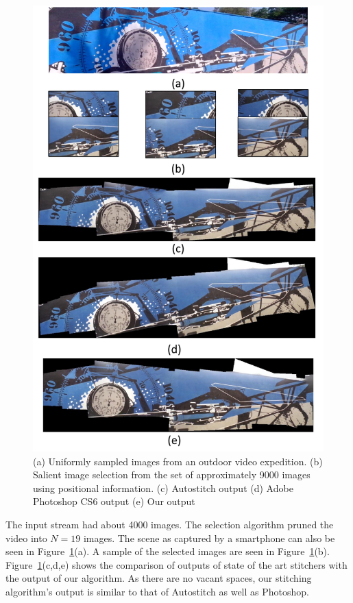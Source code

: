 \documentclass[10pt,twocolumn,letterpaper]{article}
\begin{document}
\begin{figure}[h!]
\centering
\includegraphics[width=0.8\linewidth]{figures/sac2.pdf}
\caption{ (a) Uniformly sampled images from an outdoor video
  expedition.  (b) Salient image selection from the set of
  approximately 9000 images using positional information. (c) Autostitch output
  (d) Adobe Photoshop CS6 output (e) Our output }
\label{fig:validResults1}
\end{figure}

The input stream had about 4000 images. The selection
algorithm pruned the video into $N=19$ images.
The scene as captured by a smartphone can also be seen in
Figure~\ref{fig:validResults1}(a). A sample of the
selected images are seen in Figure~\ref{fig:validResults1}(b).
Figure~\ref{fig:validResults1}(c,d,e) shows the comparison of outputs of state
of the art stitchers with the output of our algorithm. As there are no vacant
spaces, our stitching algorithm's output is similar to that of Autostitch as
well as Photoshop.
\end{document}
